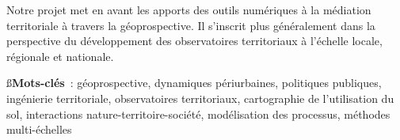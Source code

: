Notre projet met en avant les apports des outils numériques à la médiation
territoriale à travers la géoprospective. Il s'inscrit plus généralement
dans la perspective du développement des observatoires territoriaux
à l’échelle locale, régionale et nationale.

\blank[2*big]

{\ss\bf Mots-clés} :
géoprospective, dynamiques périurbaines, politiques publiques,
ingénierie territoriale, observatoires territoriaux,
cartographie de l'utilisation du sol, interactions nature-territoire-société,
modélisation des processus, méthodes multi-échelles